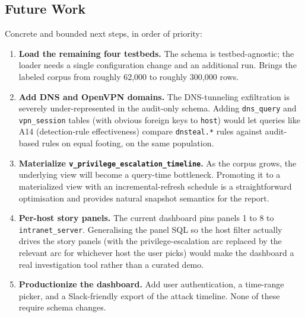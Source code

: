 \subsection{Future Work}
Concrete and bounded next steps, in order of priority:
\begin{enumerate}
  \item \textbf{Load the remaining four testbeds.} The schema is
    testbed-agnostic; the loader needs a single configuration change
    and an additional run. Brings the labeled corpus from roughly
    62{,}000 to roughly 300{,}000 rows.
  \item \textbf{Add DNS and OpenVPN domains.} The DNS-tunneling
    exfiltration is severely under-represented in the audit-only
    schema. Adding \texttt{dns\_query} and \texttt{vpn\_session}
    tables (with obvious foreign keys to \texttt{host}) would let
    queries like A14 (detection-rule effectiveness) compare
    \texttt{dnsteal.*} rules against audit-based rules on equal
    footing, on the same population.
  \item \textbf{Materialize \texttt{v\_privilege\_escalation\_timeline}.}
    As the corpus grows, the underlying view will become a query-time
    bottleneck. Promoting it to a materialized view with an
    incremental-refresh schedule is a straightforward optimisation
    and provides natural snapshot semantics for the report.
  \item \textbf{Per-host story panels.} The current dashboard pins
    panels 1 to 8 to \texttt{intranet\_server}. Generalising the
    panel SQL so the host filter actually drives the story panels
    (with the privilege-escalation arc replaced by the relevant arc
    for whichever host the user picks) would make the dashboard a
    real investigation tool rather than a curated demo.
  \item \textbf{Productionize the dashboard.} Add user
    authentication, a time-range picker, and a Slack-friendly export
    of the attack timeline. None of these require schema changes.
\end{enumerate}
